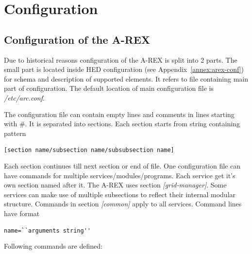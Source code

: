 \documentclass{article}                            %
\begin{document}
\section{Configuration}

\subsection{Configuration of the A-REX\label{SubSection:ConfigFile}}

Due to historical reasons configuration of the A-REX is split into
2 parts. The small part is located inside HED configuration (see Appendix~\ref{annex:arex-conf}) for schema and description of supported elements. It refers to
file containing main part of configuration. The default location of
main configuration file is \textit{/etc/arc.conf}.

The configuration file can contain empty lines and comments in lines
starting with \#. It is separated into sections. Each section starts
from string containing pattern

\begin{shaded}
\verb|[section name/subsection name/subsubsection name]|
\end{shaded}

Each section continues till next section or end of file. One configuration
file can have commands for multiple services/modules/programs. Each
service get it's own section named after it. The A-REX uses section
\emph{{[}grid-manager]}. Some services can make use of multiple subsections
to reflect their internal modular structure. Commands in section \emph{{[}common]}
apply to all services. Command lines have format 

\begin{shaded}
\verb|name=``arguments string''|
\end{shaded}
Following commands are defined:
\end{document}
